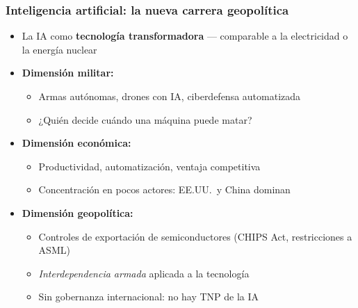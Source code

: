 \begin{frame}
\frametitle{Inteligencia artificial: la nueva carrera geopolítica}
\centering

\begin{itemize}
  \item<1-> La IA como \textbf{tecnología transformadora} --- comparable a la electricidad o la energía nuclear
  \vspace{6pt}
  \item<2-> \textbf{Dimensión militar:}
  \begin{itemize}
    \item Armas autónomas, drones con IA, ciberdefensa automatizada
    \item ¿Quién decide cuándo una máquina puede matar?
  \end{itemize}
  \vspace{6pt}
  \item<3-> \textbf{Dimensión económica:}
  \begin{itemize}
    \item Productividad, automatización, ventaja competitiva
    \item Concentración en pocos actores: EE.UU.~y China dominan
  \end{itemize}
  \vspace{6pt}
  \item<4-> \textbf{Dimensión geopolítica:}
  \begin{itemize}
    \item Controles de exportación de semiconductores (CHIPS Act, restricciones a ASML)
    \item \textit{Interdependencia armada} aplicada a la tecnología
    \item \alert{Sin gobernanza internacional}: no hay TNP de la IA
  \end{itemize}
\end{itemize}

\end{frame}
